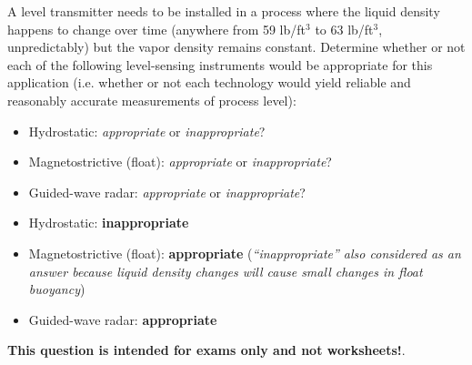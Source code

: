 

A level transmitter needs to be installed in a process where the liquid density happens to change over time (anywhere from 59 lb/ft$^{3}$ to 63 lb/ft$^{3}$, unpredictably) but the vapor density remains constant.  Determine whether or not each of the following level-sensing instruments would be appropriate for this application (i.e. whether or not each technology would yield reliable and reasonably accurate measurements of process level):

\begin{itemize}
\item{} Hydrostatic: {\it appropriate} or {\it inappropriate}?
\vskip 10pt
\item{} Magnetostrictive (float): {\it appropriate} or {\it inappropriate}?
\vskip 10pt
\item{} Guided-wave radar: {\it appropriate} or {\it inappropriate}?
\end{itemize}







\begin{itemize}
\item{} Hydrostatic: {\bf inappropriate}
\vskip 10pt
\item{} Magnetostrictive (float): {\bf appropriate} ({\it ``inappropriate'' also considered as an answer because liquid density changes will cause small changes in float buoyancy})
\vskip 10pt
\item{} Guided-wave radar: {\bf appropriate}
\end{itemize}








{\bf This question is intended for exams only and not worksheets!}.



